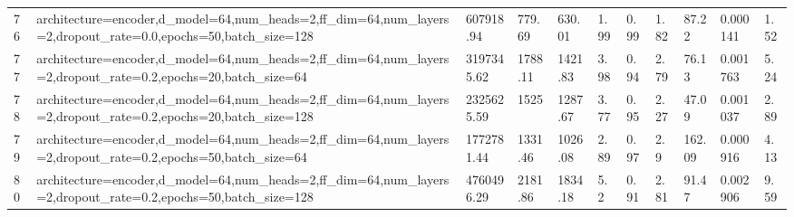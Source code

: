\begin{longtable}{C{0.8cm} L{2cm} C{1.15cm} C{1.15cm} C{1.15cm} C{1.15cm} C{0.85cm} C{1.25cm} C{1.2cm} C{1.5cm} C{1.0cm}}
76 & architecture=encoder,\newline d\_model=64,\newline num\_heads=2,\newline ff\_dim=64,\newline num\_layers=2,\newline dropout\_rate=0.0,\newline epochs=50,\newline batch\_size=128 & 607918.94 & 779.69 & 630.01 & 1.99 & 0.99 & 1.82 & 87.22 & 0.000141 & 1.52 \\
77 & architecture=encoder,\newline d\_model=64,\newline num\_heads=2,\newline ff\_dim=64,\newline num\_layers=2,\newline dropout\_rate=0.2,\newline epochs=20,\newline batch\_size=64 & 3197345.62 & 1788.11 & 1421.83 & 3.98 & 0.94 & 2.79 & 76.13 & 0.001763 & 5.24 \\
78 & architecture=encoder,\newline d\_model=64,\newline num\_heads=2,\newline ff\_dim=64,\newline num\_layers=2,\newline dropout\_rate=0.2,\newline epochs=20,\newline batch\_size=128 & 2325625.59 & 1525 & 1287.67 & 3.77 & 0.95 & 2.27 & 47.09 & 0.001037 & 2.89 \\
79 & architecture=encoder,\newline d\_model=64,\newline num\_heads=2,\newline ff\_dim=64,\newline num\_layers=2,\newline dropout\_rate=0.2,\newline epochs=50,\newline batch\_size=64 & 1772781.44 & 1331.46 & 1026.08 & 2.89 & 0.97 & 2.9 & 162.09 & 0.000916 & 4.13 \\
80 & architecture=encoder,\newline d\_model=64,\newline num\_heads=2,\newline ff\_dim=64,\newline num\_layers=2,\newline dropout\_rate=0.2,\newline epochs=50,\newline batch\_size=128 & 4760496.29 & 2181.86 & 1834.18 & 5.2 & 0.91 & 2.81 & 91.47 & 0.002906 & 9.59 \\

\end{longtable}
